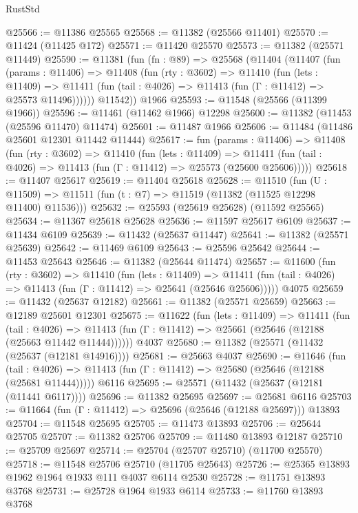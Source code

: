 \begin{lexlean}{RustStd}
\begin{coremodule}
@25566 := @11386 @25565
@25568 := @11382 (@25566 @11401)
@25570 := @11424 (@11425 @172)
@25571 := @11420 @25570
@25573 := @11382 (@25571 @11449)
@25590 := @11381
    (fun (fn : @89) =>
    @25568
      (@11404
        (@11407
          (fun (params : @11406) =>
          @11408
            (fun (rty : @3602) =>
            @11410
              (fun (lets : @11409) =>
              @11411 (fun (tail : @4026) => @11413 (fun (Γ : @11412) => @25573 @11496))))))
        @11542))
    @1966
@25593 := @11548 (@25566 (@11399 @1966))
@25596 := @11461 (@11462 @1966) @12298
@25600 := @11382 (@11453 (@25596 @11470) @11474)
@25601 := @11487 @1966
@25606 := @11484 (@11486 @25601 @12301 @11442 @11444)
@25617 := fun (params : @11406) =>
  @11408
    (fun (rty : @3602) =>
    @11410
      (fun (lets : @11409) =>
      @11411 (fun (tail : @4026) => @11413 (fun (Γ : @11412) => @25573 (@25600 @25606)))))
@25618 := @11407 @25617
@25619 := @11404 @25618
@25628 := @11510
    (fun (U : @11509) => @11511 (fun (t : @7) => @11519 (@11382 (@11525 @12298 @11400) @11536)))
@25632 := @25593 (@25619 @25628) (@11592 @25565)
@25634 := @11367 @25618 @25628
@25636 := @11597 @25617 @6109
@25637 := @11434 @6109
@25639 := @11432 (@25637 @11447)
@25641 := @11382 (@25571 @25639)
@25642 := @11469 @6109
@25643 := @25596 @25642
@25644 := @11453 @25643
@25646 := @11382 (@25644 @11474)
@25657 := @11600
    (fun (rty : @3602) =>
    @11410
      (fun (lets : @11409) =>
      @11411 (fun (tail : @4026) => @11413 (fun (Γ : @11412) => @25641 (@25646 @25606)))))
    @4075
@25659 := @11432 (@25637 @12182)
@25661 := @11382 (@25571 @25659)
@25663 := @12189 @25601 @12301
@25675 := @11622
    (fun (lets : @11409) =>
    @11411
      (fun (tail : @4026) =>
      @11413 (fun (Γ : @11412) => @25661 (@25646 (@12188 (@25663 @11442 @11444))))))
    @4037
@25680 := @11382 (@25571 (@11432 (@25637 (@12181 @14916))))
@25681 := @25663 @4037
@25690 := @11646
    (fun (tail : @4026) => @11413 (fun (Γ : @11412) => @25680 (@25646 (@12188 (@25681 @11444)))))
    @6116
@25695 := @25571 (@11432 (@25637 (@12181 (@11441 @6117))))
@25696 := @11382 @25695
@25697 := @25681 @6116
@25703 := @11664 (fun (Γ : @11412) => @25696 (@25646 (@12188 @25697))) @13893
@25704 := @11548 @25695
@25705 := @11473 @13893
@25706 := @25644 @25705
@25707 := @11382 @25706
@25709 := @11480 @13893 @12187
@25710 := @25709 @25697
@25714 := @25704 (@25707 @25710) (@11700 @25570)
@25718 := @11548 @25706 @25710 (@11705 @25643)
@25726 := @25365 @13893 @1962 @1964 @1933 @111 @4037 @6114 @2530
@25728 := @11751 @13893 @3768
@25731 := @25728 @1964 @1933 @6114
@25733 := @11760 @13893 @3768

\end{coremodule}
\end{lexlean}
